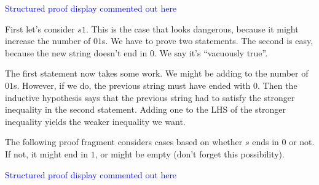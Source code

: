 \begin{definition}
\begin{editingnotes}
\textcolor{blue}{Structured proof display commented out here}

First let's consider $s1$. This is the case that looks dangerous,
because it might increase the number of $01$s.  We have to prove two
statements.  The second is easy, because the new string doesn't end in
$0$.  We say it's ``vacuously true''.

The first statement now takes some work. 
We might be adding to the number of $01$s.  
However, if we do, the previous string must have ended with $0$. 
Then the inductive hypothesis says that the previous string had to
satisfy the stronger inequality in the second statement. 
Adding one to the LHS of the stronger inequality yields the weaker
inequality we want.

The following proof fragment considers cases based on whether $s$ ends
in $0$ or not.  If not, it might end in $1$, or might be empty (don't
forget this possibility).

\textcolor{blue}{Structured proof display commented out here}
\iffalse

\begin{proof}
  3. $P(s 1)$ \\
  1. $\ms{num}(01,s1) \leq \ms{num}(10,s1) + 1$. \\
  1. If $s$ ends in $0$ then $\ms{num}(01,s1) \leq\ms{num}(10,s1) + 1$. \\
  1. Assume $s$ ends in $0$. \\
  2. $\ms{num}(01,s) \leq \ms{num}(10,s)$ 
  Inductive hypothesis (3.2), part 2. \\
  3. $\ms{num}(01,s1) = \ms{num}(01,s) + 1$ 
  Adding one more $01$. \\
  4. $\ms{num}(10,s1) = \ms{num}(10,s)$ \\
  5. $\ms{num}(01,s1) \leq\ms{num}(10,s1) + 1$. 
  Algebra (combining 3.3.1.1.2, ...3, and ...4) \\
  QED 
  Implication \\
  2. If $s$ ends in $1$ then $\ms{num}(01,s1)\leq\ms{num}(10,s1) + 1$. \\
  Inductive hypothesis, part 1; no new $01$s. \\
  3. If $s = \emptystring$ then $\ms{num}(01,s1) \leq\ms{num}(10,s1)+ 1$. \\
  $s1$ is just $1$, which has no $01$s. \\
  4. QED 
  Cases \\
  2. If $s 1$ ends in $0$ then $\ms{num}(01,s1) \leq \ms{num}(10,s1)$. \\
  Vacuously true, because $s1$ doesn't end in $0$. \\
  3. QED
  Conjunction \\
\end{proof}
\fi


\end{editingnotes}
\end{definition}
